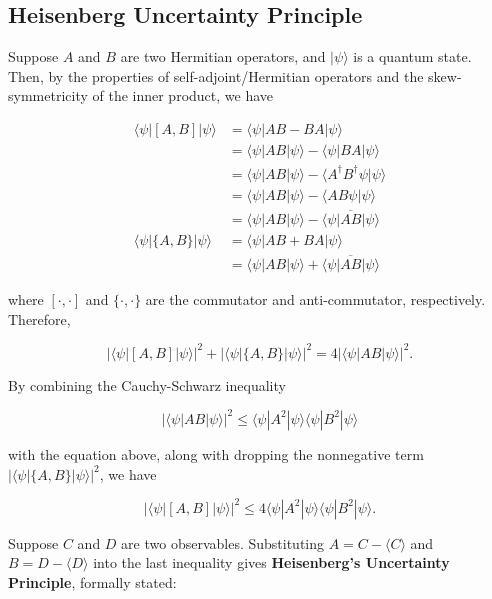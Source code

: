 \documentclass{article}
\theoremstyle{definition}
\begin{document}
  \subsection{Heisenberg Uncertainty Principle}

    Suppose $A$ and $B$ are two Hermitian operators, and $|\psi \rangle$ is a quantum state. Then, by the properties of self-adjoint/Hermitian operators and the skew-symmetricity of the inner product, we have

    \begin{align*}
      \langle \psi | [A, B] | \psi \rangle & = \langle \psi | AB - BA | \psi \rangle \\
      & = \langle \psi | AB | \psi \rangle - \langle \psi | BA | \psi \rangle \\
      & = \langle \psi | AB | \psi \rangle - \langle A^\dagger B^\dagger \psi | \psi \rangle \\
      & = \langle \psi | AB | \psi \rangle - \langle A B \psi | \psi \rangle \\
      & = \langle \psi | AB | \psi \rangle - \overline{\langle \psi | AB  | \psi \rangle} \\
      \langle \psi | \{A, B\} | \psi \rangle & = \langle \psi | AB + BA | \psi \rangle \\
      & = \langle \psi | AB | \psi \rangle + \overline{\langle \psi | AB  | \psi \rangle}
    \end{align*}

    where $[\cdot, \cdot]$ and $\{ \cdot, \cdot \}$ are the commutator and anti-commutator, respectively. Therefore,

      \[| \langle \psi | [A, B] | \psi\rangle|^2 + | \langle \psi | \{A, B\}| \psi \rangle|^2 = 4|\langle \psi | AB | \psi \rangle |^2.\]

    By combining the Cauchy-Schwarz inequality

      \[|\langle \psi | AB | \psi \rangle|^2 \leq \langle \psi | A^2 | \psi \rangle \langle \psi | B^2 | \psi \rangle\]

    with the equation above, along with dropping the nonnegative term $| \langle \psi | \{A, B\}| \psi \rangle|^2$, we have

      \[|\langle \psi| [A, B] | \psi \rangle |^2 \leq 4 \langle \psi | A^2 | \psi \rangle \langle \psi | B^2 | \psi \rangle.\]

    Suppose $C$ and $D$ are two observables. Substituting $A = C - \langle C \rangle$ and $B = D - \langle D \rangle$ into the last inequality gives \textbf{Heisenberg's Uncertainty Principle}, formally stated:
\end{document}
